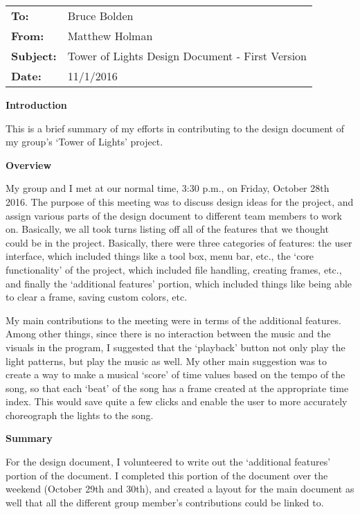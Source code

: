 \documentclass[12pt]{article}
\begin{document}
{\noindent \hspace*{-0.3cm} \begin{tabular}{l l}
	\textbf{To:} & Bruce Bolden\\
	\textbf{From:} & Matthew Holman\\
	\textbf{Subject:} & Tower of Lights Design Document - First Version\\
	\textbf{Date:} & 11/1/2016 \\
\end{tabular}}

\vspace{0.5cm}
{\noindent \textbf{Introduction}\\\par
This is a brief summary of my efforts in contributing to the design document of my group's `Tower of Lights' project.\\\par}

{\noindent \textbf{Overview}\\\par
My group and I met at our normal time, 3:30 p.m., on Friday, October 28th 2016. The purpose of this meeting was to discuss design ideas for the project, and assign various parts of the design document to different team members to work on. Basically, we all took turns listing off all of the features that we thought could be in the project. Basically, there were three categories of features: the user interface, which included things like a tool box, menu bar, etc., the `core functionality' of the project, which included file handling, creating frames, etc., and finally the `additional features' portion, which included things like being able to clear a frame, saving custom colors, etc.\par
My main contributions to the meeting were in terms of the additional features. Among other things, since there is no interaction between the music and the visuals in the program, I suggested that the `playback' button not only play the light patterns, but play the music as well. My other main suggestion was to create a way to make a musical `score' of time values based on the tempo of the song, so that each `beat' of the song has a frame created at the appropriate time index. This would save quite a few clicks and enable the user to more accurately choreograph the lights to the song.\par}

{\noindent\textbf{Summary}\\\par
For the design document, I volunteered to write out the `additional features' portion of the document. I completed this portion of the document over the weekend (October 29th and 30th), and created a layout for the main document as well that all the different group member's contributions could be linked to.\par}  
\end{document}

